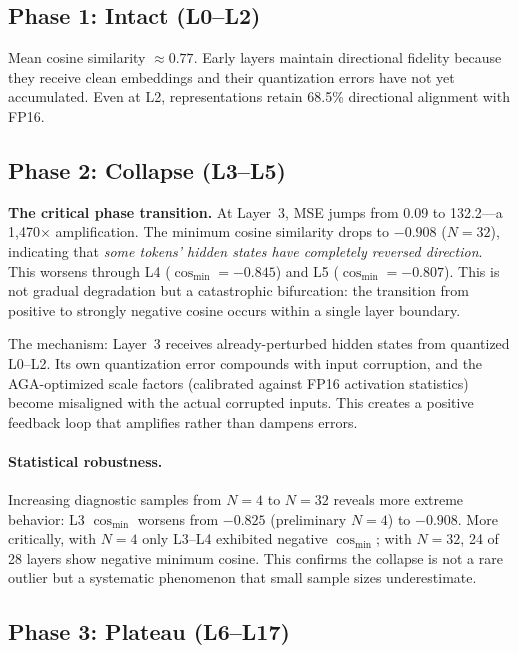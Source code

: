 \documentclass[10pt,a4paper]{article}
\begin{document}
\subsection{Phase 1: Intact (L0--L2)}

Mean cosine similarity $\approx 0.77$.
Early layers maintain directional fidelity because they receive clean embeddings and their quantization errors have not yet accumulated.
Even at L2, representations retain 68.5\% directional alignment with FP16.

\subsection{Phase 2: Collapse (L3--L5)}

\textbf{The critical phase transition.}
At Layer~3, MSE jumps from 0.09 to 132.2---a 1,470$\times$ amplification.
The minimum cosine similarity drops to $\mathbf{-0.908}$ ($N{=}32$), indicating that \textit{some tokens' hidden states have completely reversed direction}.
This worsens through L4 ($\cos_{\min} = -0.845$) and L5 ($\cos_{\min} = -0.807$).
This is not gradual degradation but a catastrophic bifurcation: the transition from positive to strongly negative cosine occurs within a single layer boundary.

The mechanism: Layer~3 receives already-perturbed hidden states from quantized L0--L2.
Its own quantization error compounds with input corruption, and the AGA-optimized scale factors (calibrated against FP16 activation statistics) become misaligned with the actual corrupted inputs.
This creates a positive feedback loop that amplifies rather than dampens errors.

\paragraph{Statistical robustness.}
Increasing diagnostic samples from $N{=}4$ to $N{=}32$ reveals more extreme behavior: L3 $\cos_{\min}$ worsens from $-0.825$ (preliminary $N{=}4$) to $-0.908$.
More critically, with $N{=}4$ only L3--L4 exhibited negative $\cos_{\min}$; with $N{=}32$, 24 of 28 layers show negative minimum cosine.
This confirms the collapse is not a rare outlier but a systematic phenomenon that small sample sizes underestimate.

\subsection{Phase 3: Plateau (L6--L17)}
\end{document}
